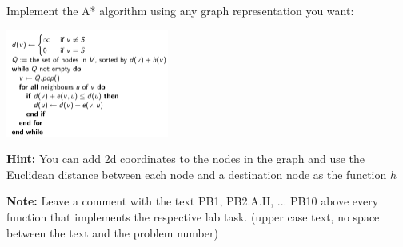 \documentclass{exam}
\begin{document}
\begin{questions}
\question Implement the A* algorithm using any graph representation you want: \cite{astar}

\includegraphics[width=0.4\textwidth]{diagrams/astar.png}

\textbf{Hint:} You can add 2d coordinates to the nodes in the graph and use the Euclidean distance between each node and a destination node as the function $h$


\end{questions}

\textbf{Note:} Leave a comment with the text PB1, PB2.A.II, ... PB10 above every function that implements the respective lab task. (upper case text, no space between the text and the problem number)

\medskip
\printbibliography
\end{document}
